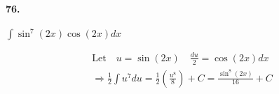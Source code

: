 


\renewcommand\assignment{Homework Set VI, Due Friday, February 17, 2023: \S 3.2 \# 76, 86 \S 3.3 \# 134, 138, 146}


    \iffalse
    \begin{equation*}
        \begin{gathered}
            Equations go here.
        \end{gathered}
    \end{equation*}

    \resizebox{\hsize}{!}{$Long equation goes here$}

    \begin{multicol*}{# of columns}
    \end{multicol*}

    \horizontal

    \fi


    \paragraph*{76.} 
    $\int\sin^7(2x)\cos(2x)dx$
    \\
    \begin{mdframed}
        \begin{equation*}
            \begin{gathered}
                \text{Let} \quad u = \sin(2x) \quad \frac{du}{2} = \cos(2x)dx    \\
                \Rightarrow \frac{1}{2} \int u^7du              
                = \frac{1}{2}\left(\frac{u^8}{8}\right) + C     
                = \boxed{\frac{\sin^8(2x)}{16} + C}
            \end{gathered}
        \end{equation*}
    \end{mdframed}

